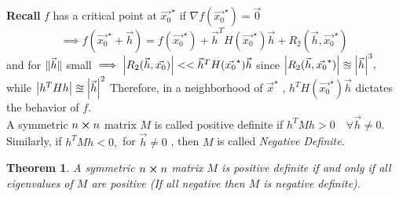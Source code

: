 \documentclass[
	12pt,
	]{article}
\DeclarePairedDelimiter{\norm}{\lVert}{\rVert}
\theoremstyle{custom}
\newtheorem{theorem}{Theorem}[section]
\theoremstyle{custom}
\theoremstyle{custom}
\theoremstyle{custom}
\theoremstyle{custom}
\theoremstyle{definition}
\theoremstyle{example}
\theoremstyle{note}
\theoremstyle{remark}
\theoremstyle{example}
\newcounter{theo}[section]\setcounter{theo}{0}
\numberwithin{equation}{subsection}
\begin{document}
	   		 \noindent \textbf{Recall }
	   		 $f$ has a critical point at $\vec{x_{0}}^{\star}$ if $\nabla f(\vec{x_{0}}^{\star}) = \vec{0}$
	   		 $$ \implies f(\vec{x_{0}}^{\star} + \vec{h}) = f(\vec{x_{0}}^{\star}) + \vec{h}^{T}H(\vec{x_{0}}^{\star})\vec{h} + R_{2}(\vec{h}, \vec{x_{0}}^{\star})$$ 
	   		 and for $\norm{\vec{h}}$ small $\implies \abs{R_{2}(\vec{h}, \vec{x_{0}})} << \vec{h}^{T}H(\vec{x_{0}}^{\star})\vec{h}$ since $\abs{R_{2}(\vec{h}, \vec{x_{0}}^{\star})} \approxeq \abs{\vec{h}}^{3} ,$ \\ while $\abs{h^{T}Hh} \approxeq \abs{\vec{h}}^{2}$
	   		 Therefore, in a neighborhood of $\vec{x}^{\star}$ , $h^{T}H(\vec{x_{0}}^{\star})\vec{h}$ dictates the behavior of $f$. \\
	   		 A symmetric $n\cross n$ matrix $M$ is called positive definite if $h^{T} M h >0 \quad \forall \vec{h}\neq 0$.\\
	   		 Similarly, if $h^{T}Mh < 0 , $ for $\vec{h} \neq 0$ , then $M$ is called \textit{Negative Definite}.
	   		 
	   		 \begin{theorem}
	   		 	A symmetric $n\cross n$ matrix $M$ is positive definite if and only if all eigenvalues of $M$ are positive (If all negative then $M$ is negative definite).
	   		 \end{theorem}
	   		 
\end{document}
